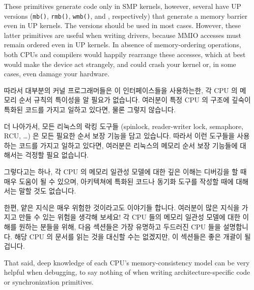 These primitives generate code only in SMP kernels, however, several
have UP versions ({\tt mb()}, {\tt rmb()}, {\tt wmb()},
and ,
respectively) that generate a memory barrier even in UP kernels. The 
versions should be used in most cases. However, these latter primitives
are useful when writing drivers, because MMIO accesses must remain
ordered even in UP kernels. In absence of memory-ordering operations,
both CPUs and compilers would happily rearrange these accesses, which at
best would make the device act strangely, and could crash your kernel or,
in some cases, even damage your hardware.
\fi

따라서 대부분의 커널 프로그래머들은 이 인터페이스들을 사용하는한, 각 CPU 의
메모리 순서 규칙의 특이성을 알 필요가 없습니다.
여러분이 특정 CPU 의 구조에 깊숙이 특화된 코드를 가지고 일하고 있다면, 물론
그렇지 않습니다.

더 나아가서, 모든 리눅스의 락킹 도구들 (spinlock, reader-writer lock,
semaphore, RCU, \ldots) 은 모든 필요한 순서 보장 기능을 담고 있습니다.
따라서 이런 도구들을 사용하는 코드를 가지고 일하고 있다면, 여러분은 리눅스의
메모리 순서 보장 기능들에 대해서는 걱정할 필요 없습니다.

그렇다고는 하나, 각 CPU 의 메모리 일관성 모델에 대한 깊은 이해는 디버깅을 할 때
매우 도움이 될 수 있으며, 아키텍쳐에 특화된 코드나 동기화 도구를 작성할 때에
대해서는 말할 것도 없습니다.

한편, 얕은 지식은 매우 위험한 것이라고도 이야기들 합니다.
여러분이 많은 지식을 가지고 만들 수 있는 위험을 생각해 보세요!
각 CPU 들의 메모리 일관성 모델에 대한 이해를 원하는 분들을 위해, 다음 섹션들은
가장 유명하고 두드러진 CPU 들을 설명합니다.
해당 CPU 의 문서를 읽는 것을 대신할 수는 없겠지만, 이 섹션들은 좋은 개괄이 될
겁니다.
\iffalse

That said, deep knowledge of each CPU's memory-consistency model
can be very helpful when debugging, to say nothing of when writing
architecture-specific code or synchronization primitives.

